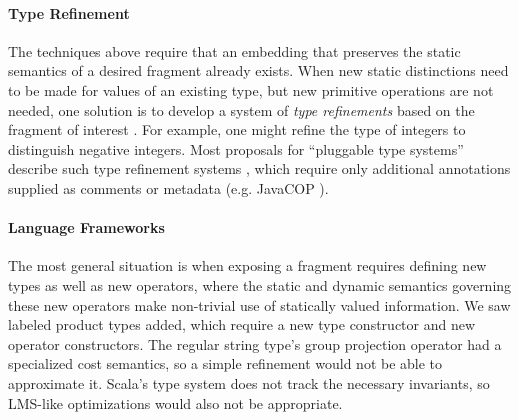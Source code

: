 \documentclass[9pt,preprint]{sigplanconf}
\begin{document}
\paragraph{Type Refinement}
The techniques above require that an embedding that preserves the static semantics of a desired fragment already exists. When new static distinctions need to be made for values of an existing type, but new primitive operations are not needed, one solution is to develop a system of \emph{type refinements} based on the fragment of interest \cite{Freeman91}. For example, one might refine the type of integers to distinguish negative integers. Most proposals for ``pluggable type systems'' describe such type refinement systems \cite{Brac04a}, which require only additional annotations supplied as comments or metadata (e.g. JavaCOP \cite{Andreae:2006:FIP:1167473.1167479}). %

\paragraph{Language Frameworks}
The most general situation is when exposing a fragment requires defining new types as well as new operators, where the static and dynamic semantics governing these new operators make non-trivial use of  statically valued information. 
We saw labeled product types added, which require a new type constructor and new operator constructors. The regular string type's group projection operator had a specialized cost semantics, so a simple refinement would not be able to approximate it. Scala's type system does not track the necessary invariants, so LMS-like optimizations would also not be appropriate.%

\end{document}
